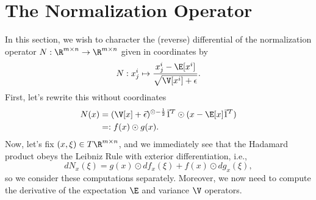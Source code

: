 


\section{The Normalization Operator}



In this section, we wish to character the (reverse) differential of the normalization operator $N:\R^{m\times n}\to\R^{m\times n}$ given in coordinates by
$$N:x^i_j\mapsto \frac{x^i_j-\E[x^i]}{\sqrt{\V[x^i]+\epsilon}}.$$
First, let's rewrite this without coordinates
\begin{align*}
	N(x)&=(\V[x]+\vec{\epsilon})^{\odot-\frac{1}{2}}\vec{1}^T\odot(x-\E[x]\vec{1}^T)\\
	&=:f(x)\odot g(x).
\end{align*}
Now, let's fix $(x,\xi)\in T\R^{m\times n}$, and we immediately see that the Hadamard product obeys the Leibniz Rule with exterior differentiation, i.e.,
$$dN_x(\xi)=g(x)\odot df_x(\xi)+f(x)\odot dg_x(\xi),$$
so we consider these computations separately.  Moreover, we now need to compute the derivative of the expectation $\E$ and variance $\V$ operators.

